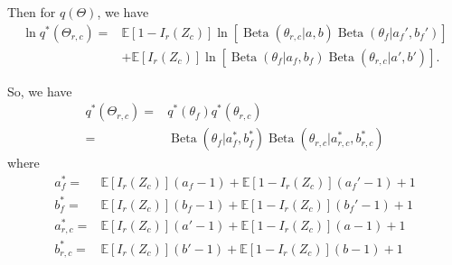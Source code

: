 \documentclass[11pt]{extarticle}
\newcommand{\E}{\mathbb{E}}
\newcommand{\0}{\mathbf{0}}
\renewcommand{\(}{\left(}
\renewcommand{\)}{\right)}
\DeclareMathOperator{\Beta}{Beta}
\theoremstyle{definition}
\begin{document}
\par Then for $q(\Theta)$, we have
\begin{align*}
	\ln q^{*}(\Theta_{r,c}) =& \E[1-I_{r}(Z_{c})] \ln\left[\Beta(\theta_{r,c} \vert a, b)\Beta(\theta_{f} \vert a_{f}', b_{f}')\right] \\ 
	& + \E[I_{r}(Z_{c})] \ln\left[\Beta(\theta_{f} \vert a_{f}, b_{f}) \Beta(\theta_{r,c}\vert a', b')\right].
\end{align*}
\par So, we have 
\begin{align*}
	q^{*}(\Theta_{r,c}) =& q^{*}(\theta_{f})q^{*}(\theta_{r,c}) \\
	=& \Beta(\theta_{f} \vert a_{f}^{*}, b_{f}^{*}) \Beta(\theta_{r,c} \vert a_{r,c}^{*}, b_{r,c}^{*})
\end{align*}
where
\begin{align*}
	a_{f}^{*} =& \E[I_{r}(Z_{c})](a_{f}-1) + \E[1-I_{r}(Z_{c})](a_{f}'-1) + 1 \\
	b_{f}^{*} =& \E[I_{r}(Z_{c})](b_{f}-1) + \E[1-I_{r}(Z_{c})](b_{f}'-1) + 1 \\
	a_{r,c}^{*} =& \E[I_{r}(Z_{c})](a' - 1) + \E[1 - I_{r}(Z_{c})](a-1) + 1 \\
	b_{r,c}^{*} =& \E[I_{r}(Z_{c})](b' - 1) + \E[1 - I_{r}(Z_{c})](b-1) + 1
\end{align*}


\newpage


\end{document}
